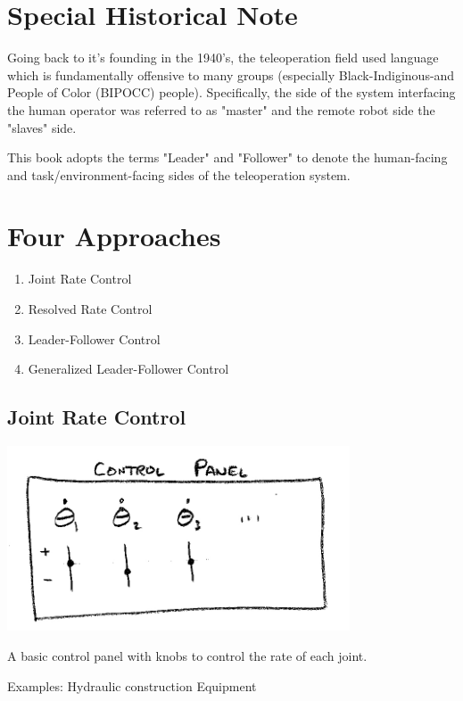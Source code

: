 \section{Special Historical Note}
Going back to it's founding in the 1940's, the teleoperation field used language
which is fundamentally offensive to many groups (especially Black-Indiginous-and People
of Color (BIPOCC) people).  Specifically, the side of the system interfacing the 
human operator was referred to as "master" and the remote robot side the "slaves" side. 

This book adopts the terms "Leader" and "Follower" to denote the human-facing and 
task/environment-facing sides of the teleoperation system. 


\section{Four Approaches}
\begin{enumerate}
	\item Joint Rate Control
	\item Resolved Rate Control
	\item Leader-Follower Control
	\item Generalized Leader-Follower Control
\end{enumerate}


\subsection{Joint Rate Control}

\includegraphics[width=4.0in]{figs14/00398.jpg}

A basic control panel with knobs to control the rate of each joint.

Examples:   Hydraulic construction Equipment

